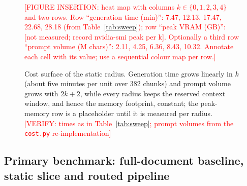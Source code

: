 \documentclass[pdflatex,sn-mathphys-num]{sn-jnl}
\newcommand{\todo}[1]{\textcolor{red}{#1}}
\newcommand{\verify}[1]{\todo{[VERIFY: #1]}}
\theoremstyle{thmstyleone}%
\theoremstyle{thmstylethree}%
\begin{document}
\begin{figure}[htbp]
  \centering
  \todo{[FIGURE INSERTION: heat map with columns $k\in\{0,1,2,3,4\}$ and two rows. Row ``generation time (min)'': 7.47, 12.13, 17.47, 22.68, 28.18 (from Table~\ref{tab:sweep}); row ``peak VRAM (GB)'': \todo{[not measured; record nvidia-smi peak per k]}. Optionally a third row ``prompt volume (M chars)'': 2.11, 4.25, 6.36, 8.43, 10.32. Annotate each cell with its value; use a sequential colour map per row.]}
  \caption{Cost surface of the static radius. Generation time grows linearly in $k$ (about five minutes per unit over 382 chunks) and prompt volume grows with $2k+2$, while every radius keeps the reserved context window, and hence the memory footprint, constant; the peak-memory row is a placeholder until it is measured per radius.\verify{times as in Table~\ref{tab:sweep}; prompt volumes from the \texttt{cost.py} re-implementation}}
  \label{fig:heatmap}
\end{figure}

\subsection{Primary benchmark: full-document baseline, static slice and routed pipeline}\label{sec:primary}
\end{document}
